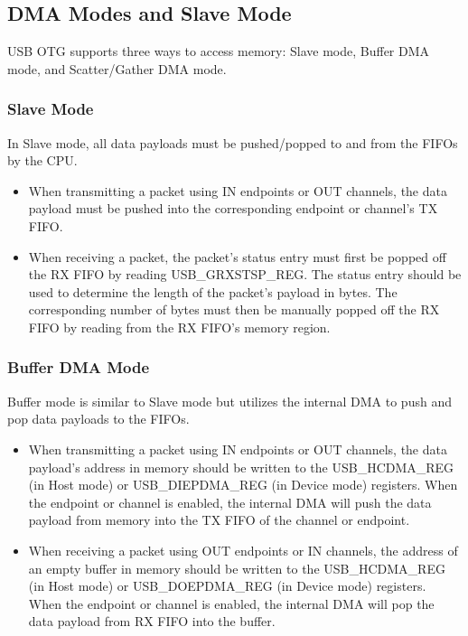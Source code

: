 \documentclass[main\_\_EN.tex]{subfiles}
\begin{document}
\subsection{DMA Modes and Slave Mode}

USB OTG supports three ways to access memory: Slave mode, Buffer DMA mode, and Scatter/Gather DMA mode.

\subsubsection{ Slave Mode}

In Slave mode, all data payloads must be pushed/popped to and from the FIFOs by the CPU.

\begin{itemize}
\item When transmitting a packet using IN endpoints or OUT channels, the data payload must be pushed into the corresponding endpoint or channel’s TX FIFO.
\item When receiving a packet, the packet’s status entry must first be popped off the RX FIFO by reading USB\_GRXSTSP\_REG. The status entry should be used to determine the length of the packet’s payload in bytes. The corresponding number of bytes must then be manually popped off the RX FIFO by reading from the RX FIFO’s memory region.
\end{itemize}

\subsubsection{ Buffer DMA Mode}

Buffer mode is similar to Slave mode but utilizes the internal DMA to push and pop data payloads to the FIFOs.

\begin{itemize}
\item When transmitting a packet using IN endpoints or OUT channels, the data payload’s address in memory should be written to the USB\_HCDMA\_REG (in Host mode) or USB\_DIEPDMA\_REG (in Device mode) registers. When the endpoint or channel is enabled, the internal DMA will push the data payload from memory into the TX FIFO of the channel or endpoint.
\item When receiving a packet using OUT endpoints or IN channels, the address of an empty buffer in memory should be written to the USB\_HCDMA\_REG (in Host mode) or USB\_DOEPDMA\_REG (in Device mode) registers. When the endpoint or channel is enabled, the internal DMA will pop the data payload from RX FIFO into the buffer.
\end{itemize}
\end{document}
